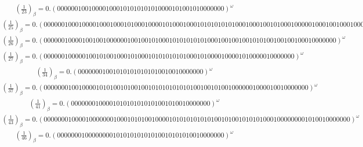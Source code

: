 \documentclass[fleqn]{article}
\begin{document}
\begin{equation*}
\begin{split}
(\frac{1}{23})_\beta = 0.(000000100100001000101010101010000101001010000000)^\omega
\end{split}\end{equation*}
\begin{equation*}
\begin{split}
(\frac{1}{25})_\beta = 0.(0000001000100001000100010100010000101000100010101010101000100010010100010000010001001000100010000000)^\omega
\end{split}\end{equation*}
\begin{equation*}
\begin{split}
(\frac{1}{26})_\beta = 0.(000000100001001001000000100100101000101010101010001001001001010100100100100010000000)^\omega
\end{split}\end{equation*}
\begin{equation*}
\begin{split}
(\frac{1}{27})_\beta = 0.(000000100000100101001000101000101010101010001010000100001010000010000000)^\omega
\end{split}\end{equation*}
\begin{equation*}
\begin{split}
(\frac{1}{34})_\beta = 0.(000000010010101010101010010010000000)^\omega
\end{split}\end{equation*}
\begin{equation*}
\begin{split}
(\frac{1}{37})_\beta = 0.(0000000100100001010100101001001010101010101001001010010000001000010010000000)^\omega
\end{split}\end{equation*}
\begin{equation*}
\begin{split}
(\frac{1}{41})_\beta = 0.(0000000100001010101010101001010010000000)^\omega
\end{split}\end{equation*}
\begin{equation*}
\begin{split}
(\frac{1}{43})_\beta = 0.(0000000100001000000010001010100100001010101010101001010010101010001000000001010010000000)^\omega
\end{split}\end{equation*}
\begin{equation*}
\begin{split}
(\frac{1}{46})_\beta = 0.(000000010000000010101010101010010101010010000000)^\omega
\end{split}\end{equation*}
\end{document}
